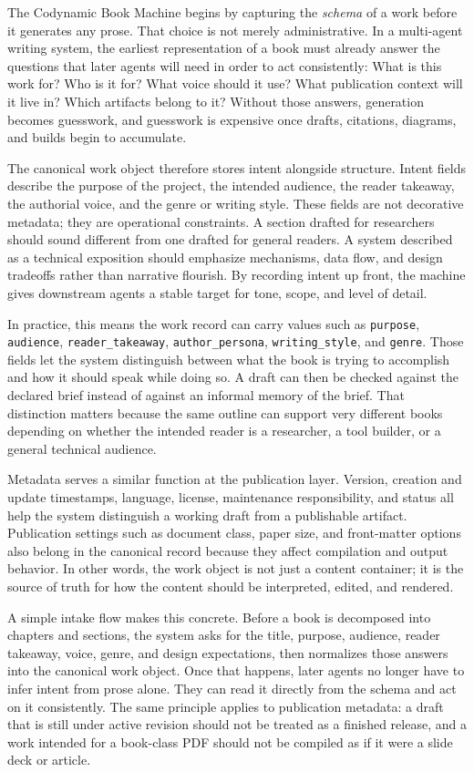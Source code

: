 The Codynamic Book Machine begins by capturing the \emph{schema} of a work before it generates any prose. That choice is not merely administrative. In a multi-agent writing system, the earliest representation of a book must already answer the questions that later agents will need in order to act consistently: What is this work for? Who is it for? What voice should it use? What publication context will it live in? Which artifacts belong to it? Without those answers, generation becomes guesswork, and guesswork is expensive once drafts, citations, diagrams, and builds begin to accumulate.

The canonical work object therefore stores intent alongside structure. Intent fields describe the purpose of the project, the intended audience, the reader takeaway, the authorial voice, and the genre or writing style. These fields are not decorative metadata; they are operational constraints. A section drafted for researchers should sound different from one drafted for general readers. A system described as a technical exposition should emphasize mechanisms, data flow, and design tradeoffs rather than narrative flourish. By recording intent up front, the machine gives downstream agents a stable target for tone, scope, and level of detail.

In practice, this means the work record can carry values such as \texttt{purpose}, \texttt{audience}, \texttt{reader\_takeaway}, \texttt{author\_persona}, \texttt{writing\_style}, and \texttt{genre}. Those fields let the system distinguish between what the book is trying to accomplish and how it should speak while doing so. A draft can then be checked against the declared brief instead of against an informal memory of the brief. That distinction matters because the same outline can support very different books depending on whether the intended reader is a researcher, a tool builder, or a general technical audience.

Metadata serves a similar function at the publication layer. Version, creation and update timestamps, language, license, maintenance responsibility, and status all help the system distinguish a working draft from a publishable artifact. Publication settings such as document class, paper size, and front-matter options also belong in the canonical record because they affect compilation and output behavior. In other words, the work object is not just a content container; it is the source of truth for how the content should be interpreted, edited, and rendered.

A simple intake flow makes this concrete. Before a book is decomposed into chapters and sections, the system asks for the title, purpose, audience, reader takeaway, voice, genre, and design expectations, then normalizes those answers into the canonical work object. Once that happens, later agents no longer have to infer intent from prose alone. They can read it directly from the schema and act on it consistently. The same principle applies to publication metadata: a draft that is still under active revision should not be treated as a finished release, and a work intended for a book-class PDF should not be compiled as if it were a slide deck or article.

